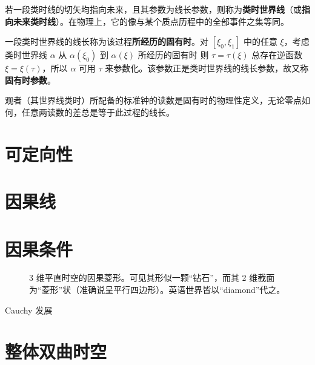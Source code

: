 \begin{definition}
    若一段类时线的切矢均指向未来，且其参数为线长参数，则称为\textbf{类时世界线}（或\textbf{指向未来类时线}）。在物理上，它的像与某个质点历程中的全部事件之集等同。
\end{definition}
\begin{definition}
    一段类时世界线的线长称为该过程\textbf{所经历的固有时}。对 $\left[\xi_{0},\xi_{1}\right]$ 中的任意 $\xi$，考虑类时世界线 $\alpha$ 从 $\alpha\left(\xi_{0}\right)$ 到 $\alpha(\xi)$ 所经历的固有时
    则 $\tau={\tau}(\xi)$ 总存在逆函数 $\xi=\xi(\tau)$，所以 $\alpha$ 可用 $\tau$ 来参数化。该参数正是类时世界线的线长参数，故又称\textbf{固有时参数}。
\end{definition}
观者（其世界线类时）所配备的标准钟的读数是固有时的物理性定义，无论零点如何，任意两读数的差总是等于此过程的线长。




\section{可定向性}

\section{因果线}

\section{因果条件}



\begin{figure}[h!]\centering
    \caption{3 维平直时空的因果菱形。可见其形似一颗“钻石”，而其 2 维截面为“菱形”状（准确说呈平行四边形）。英语世界皆以“diamond”代之。}
\end{figure}

Cauchy 发展

\section{整体双曲时空}

